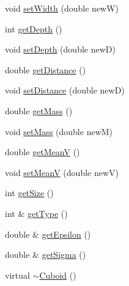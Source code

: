 \begin{DoxyCompactItemize}
void \hyperlink{classCuboid_a05ebb7b92f2cf7d99470e0ee37565204}{set\-Width} (double new\-W)
\item 
int \hyperlink{classCuboid_a8a48fe6647e1b6aaefdcdc919d1d60ca}{get\-Depth} ()
\item 
void \hyperlink{classCuboid_ab4a1117474dde7ca1bc7abb17efc60d0}{set\-Depth} (double new\-D)
\item 
double \hyperlink{classCuboid_acce74194a5322bc75176c0b0268dc99e}{get\-Distance} ()
\item 
void \hyperlink{classCuboid_a0118ee212ed9445762e4b66bd049ab29}{set\-Distance} (double new\-D)
\item 
double \hyperlink{classCuboid_a800f78fae7fd092724dc959cfa409894}{get\-Mass} ()
\item 
void \hyperlink{classCuboid_a289a3115396705a7fa2caa8bd873f20d}{set\-Mass} (double new\-M)
\item 
double \hyperlink{classCuboid_ab462bd1cd2a16a29f05b2dd677b600f4}{get\-Mean\-V} ()
\item 
void \hyperlink{classCuboid_a078822ffa44af0b079ed075ad087df26}{set\-Mean\-V} (double new\-V)
\item 
int \hyperlink{classCuboid_a2a324c6cb87afa82b9b933cd3b6bd2cf}{get\-Size} ()
\item 
int \& \hyperlink{classCuboid_ae089a8e4c5ff713c95876d9216e71f92}{get\-Type} ()
\item 
double \& \hyperlink{classCuboid_a3d13a5c0849de7c64ce0076a6f65b995}{get\-Epsilon} ()
\item 
double \& \hyperlink{classCuboid_a4b896bf3579b2b436df51c8f99b75b34}{get\-Sigma} ()
\item 
virtual \hyperlink{classCuboid_aba010c63b64540741c25b5e89b7fabbb}{$\sim$\-Cuboid} ()
\end{DoxyCompactItemize}
